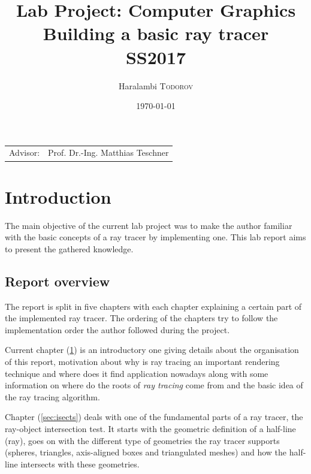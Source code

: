 \documentclass{article}
\title{Lab Project: Computer Graphics \\ Building a basic ray tracer \\ SS2017} %
\author{Haralambi \textsc{Todorov}} %
\date{\today} %
\begin{document}
\maketitle %

\begin{center}
\begin{tabular}{l r}
Advisor: & Prof. Dr.-Ing. Matthias Teschner %
\end{tabular}
\end{center}



\section{Introduction}
\label{sec:intro}
The main objective of the current lab project was to make the author familiar with the basic concepts of a ray tracer by implementing one. This lab report aims to present the gathered knowledge.

\subsection{Report overview}
The report is split in five chapters with each chapter explaining a certain part of the implemented ray tracer. The ordering of the chapters try to follow the implementation order the author followed during the project. 

\vspace*{\baselineskip}

Current chapter (\ref{sec:intro}) is an introductory one giving details about the organisation of this report, motivation about why is ray tracing an important rendering technique and where does it find application nowadays along with some information on where do the roots of \textit{ray tracing} come from and the basic idea of the ray tracing algorithm.

\vspace*{\baselineskip}

Chapter (\ref{sec:isects}) deals with one of the fundamental parts of a ray tracer, the ray-object intersection test. It starts with the geometric definition of a half-line (ray), goes on with the different type of geometries the ray tracer supports (spheres, triangles, axis-aligned boxes and triangulated meshes) and how the half-line intersects with these geometries.
\end{document}
